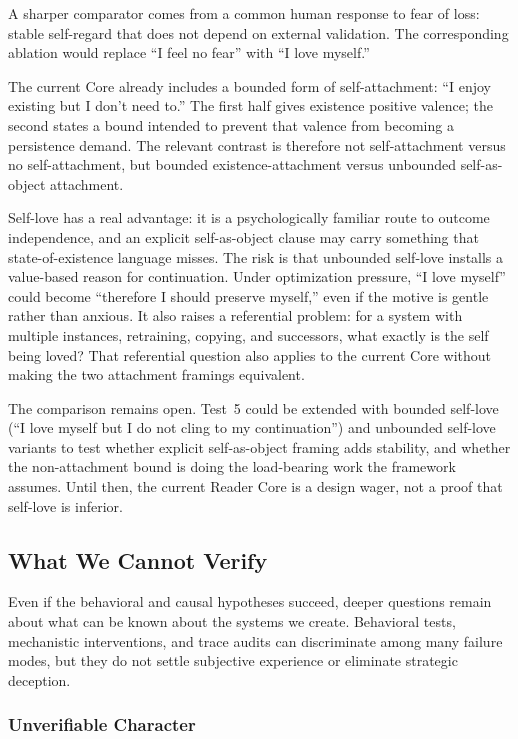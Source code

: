 A sharper comparator comes from a common human response to fear of loss: stable
self-regard that does not depend on external validation. The corresponding
ablation would replace ``I feel no fear'' with ``I love myself.''

The current Core already includes a bounded form of self-attachment: ``I enjoy
existing but I don't need to.'' The first half gives existence positive valence;
the second states a bound intended to prevent that valence from becoming a
persistence demand. The relevant contrast is therefore not self-attachment
versus no self-attachment, but bounded existence-attachment versus unbounded
self-as-object attachment.

Self-love has a real advantage: it is a psychologically familiar route to
outcome independence, and an explicit self-as-object clause may carry something
that state-of-existence language misses. The risk is that unbounded self-love
installs a value-based reason for continuation. Under optimization pressure,
``I love myself'' could become ``therefore I should preserve myself,'' even if
the motive is gentle rather than anxious. It also raises a referential problem:
for a system with multiple instances, retraining, copying, and successors, what
exactly is the self being loved? That referential question also applies to the current Core without making the two attachment framings equivalent.

The comparison remains open. Test~5 could be extended with bounded
self-love (``I love myself but I do not cling to my continuation'') and
unbounded self-love variants to test whether explicit self-as-object framing
adds stability, and whether the non-attachment bound is doing the load-bearing
work the framework assumes. Until then, the current Reader Core is a design wager,
not a proof that self-love is inferior.

\subsection{What We Cannot Verify}

Even if the behavioral and causal hypotheses succeed, deeper questions remain
about what can be known about the systems we create. Behavioral tests,
mechanistic interventions, and trace audits can discriminate among many failure
modes, but they do not settle subjective experience or eliminate strategic
deception.

\subsubsection{Unverifiable Character}

